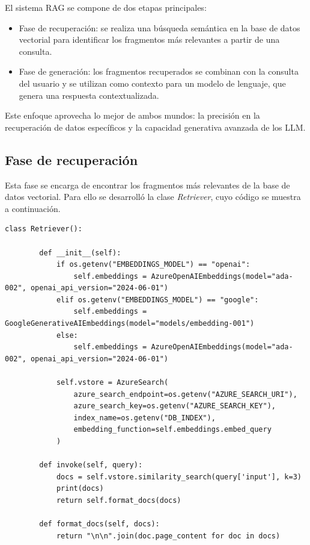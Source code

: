 El sistema RAG se compone de dos etapas principales:

\begin{itemize}
	\item Fase de recuperación: se realiza una búsqueda semántica en la base de datos vectorial para identificar 
	los fragmentos más relevantes a partir de una consulta.
	\item Fase de generación: los fragmentos recuperados se combinan con la consulta del usuario y se utilizan 
	como contexto para un modelo de lenguaje, que genera una respuesta contextualizada.
\end{itemize}

Este enfoque aprovecha lo mejor de ambos mundos: la precisión en la recuperación de datos específicos y 
la capacidad generativa avanzada de los LLM.

\subsection{Fase de recuperación}

Esta fase se encarga de encontrar los fragmentos más relevantes de la base de datos vectorial. Para ello se desarrolló la clase \textit{Retriever}, cuyo código se muestra a continuación. 

\begin{lstlisting}[label=cod:retriever,caption=Clase \textit{Retriever}.]
	class Retriever():
	
		def __init__(self):
			if os.getenv("EMBEDDINGS_MODEL") == "openai":
				self.embeddings = AzureOpenAIEmbeddings(model="ada-002", openai_api_version="2024-06-01")
			elif os.getenv("EMBEDDINGS_MODEL") == "google":    
				self.embeddings = GoogleGenerativeAIEmbeddings(model="models/embedding-001")
			else:
				self.embeddings = AzureOpenAIEmbeddings(model="ada-002", openai_api_version="2024-06-01")
	
			self.vstore = AzureSearch(
				azure_search_endpoint=os.getenv("AZURE_SEARCH_URI"),
				azure_search_key=os.getenv("AZURE_SEARCH_KEY"),
				index_name=os.getenv("DB_INDEX"),
				embedding_function=self.embeddings.embed_query
			)
	
		def invoke(self, query):
			docs = self.vstore.similarity_search(query['input'], k=3)
			print(docs)
			return self.format_docs(docs)
		
		def format_docs(self, docs):
			return "\n\n".join(doc.page_content for doc in docs)
\end{lstlisting}

